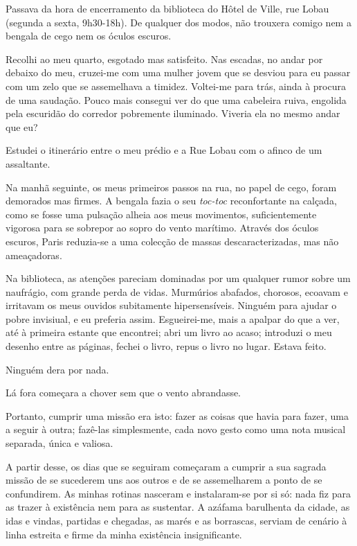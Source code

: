 Passava da hora de encerramento da biblioteca do Hôtel de Ville, rue
Lobau (segunda a sexta, 9h30-18h). De qualquer dos modos, não trouxera
comigo nem a bengala de cego nem os óculos escuros.

Recolhi ao meu quarto, esgotado mas satisfeito. Nas escadas, no andar
por debaixo do meu, cruzei-me com uma mulher jovem que se desviou para
eu passar com um zelo que se assemelhava a timidez. Voltei-me para trás,
ainda à procura de uma saudação. Pouco mais consegui ver do que uma
cabeleira ruiva, engolida pela escuridão do corredor pobremente iluminado. Viveria ela no mesmo andar que eu?

Estudei o itinerário entre o meu prédio e a Rue Lobau com o afinco de um
assaltante.

Na manhã seguinte, os meus primeiros passos na rua, no papel de cego,
foram demorados mas firmes. A bengala fazia
o seu \emph{toc-toc }reconfortante na calçada, como se fosse uma pulsação alheia aos meus movimentos, suficientemente vigorosa para se
sobrepor ao sopro do vento marítimo. Através dos óculos escuros, Paris
reduzia-se a uma colecção de massas descaracterizadas, mas não
ameaçadoras.

Na biblioteca, as atenções pareciam dominadas por um qualquer rumor
sobre um naufrágio, com grande perda de vidas. Murmúrios abafados,
chorosos, ecoavam e irritavam os meus ouvidos subitamente
hipersensíveis. Ninguém para ajudar o pobre invisiual, e eu preferia
assim. Esgueirei-me, mais a apalpar do que a ver, até à primeira estante
que encontrei; abri um livro ao acaso; introduzi o meu desenho entre
as páginas, fechei o livro, repus o livro no lugar. Estava feito.

Ninguém dera por nada.

Lá fora começara a chover sem que o vento abrandasse.

Portanto, cumprir uma missão era isto: fazer as coisas que havia para
fazer, uma a seguir à outra; fazê-las simplesmente, cada novo gesto como
uma nota musical separada, única e valiosa.

A partir desse, os dias que se seguiram começaram a cumprir a sua
sagrada missão de se sucederem uns aos outros e de se assemelharem a
ponto de se confundirem. As minhas rotinas nasceram e instalaram-se
por si só: nada fiz para as trazer à existência nem para as sustentar. A
azáfama barulhenta da cidade, as idas e vindas, partidas e chegadas, as
marés e as borrascas, serviam de cenário à linha estreita e firme da
minha existência insignificante.

